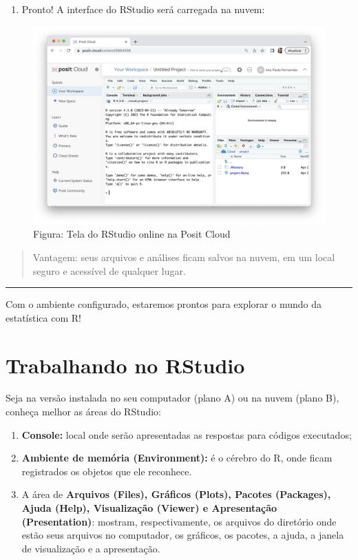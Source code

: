 \documentclass[
]{book}
\providecommand{\tightlist}{%
  \setlength{\itemsep}{0pt}\setlength{\parskip}{0pt}}
\begin{document}
\begin{enumerate}
\def\labelenumi{\arabic{enumi}.}
\setcounter{enumi}{4}
\tightlist
\item
  Pronto! A interface do RStudio será carregada na nuvem:
\end{enumerate}

\begin{figure}
\centering
\includegraphics{telaRStudioPosit.png}
\caption{Figura: Tela do RStudio online na Posit Cloud}
\end{figure}

\begin{quote}
Vantagem: seus arquivos e análises ficam salvos na nuvem, em um local seguro e acessível de qualquer lugar.
\end{quote}

\begin{center}\rule{0.5\linewidth}{0.5pt}\end{center}

Com o ambiente configurado, estaremos prontos para explorar o mundo da estatística com R!

\chapter{Trabalhando no RStudio}\label{trabalhando-RStudio}

Seja na versão instalada no seu computador (plano A) ou na nuvem (plano B), conheça melhor as áreas do RStudio:

\begin{enumerate}
\def\labelenumi{\arabic{enumi}.}
\item
  \textbf{Console:} local onde serão apresentadas as respostas para códigos executados;
\item
  \textbf{Ambiente de memória (Environment):} é o cérebro do R, onde ficam registrados os objetos que ele reconhece.
\item
  A área de \textbf{Arquivos (Files), Gráficos (Plots), Pacotes (Packages), Ajuda (Help), Visualização (Viewer) e Apresentação (Presentation)}: mostram, respectivamente, os arquivos do diretório onde estão seus arquivos no computador, os gráficos, os pacotes, a ajuda, a janela de visualização e a apresentação.
\end{enumerate}
\end{document}

